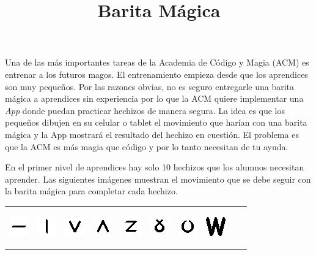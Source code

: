 \documentclass{oci}
\title{Barita Mágica}
\begin{document}
\begin{problemDescription}
Una de las más importantes tareas de la 
Academia de Código y Magia (ACM) es entrenar a los futuros magos.
El entrenamiento empieza desde que los aprendices son muy pequeños. 
Por las razones obvias, no es seguro entregarle una barita mágica a aprendices sin experiencia
por lo que la ACM quiere implementar una \emph{App} donde puedan practicar hechizos
de manera segura. La idea es que los pequeños dibujen en su celular o tablet 
el movimiento que harían con una barita mágica y la App mostrará el resultado del hechizo en cuestión.
El problema es que la ACM es más magia que código y por lo tanto necesitan de tu ayuda.

En el primer nivel de aprendices hay solo 10 hechizos que los alumnos necesitan aprender. 
Las siguientes imágenes muestran el movimiento que se debe seguir con la barita mágica para completar
cada hechizo.

\begin{center}
\begin{tabular}{cccccccccc}
\includegraphics{imgs/figA00.png} &
\includegraphics{imgs/figA01.png} &
\includegraphics{imgs/figA02.png} &
\includegraphics{imgs/figA03.png} &
\includegraphics{imgs/figA04.png} &
\includegraphics{imgs/figA05.png} &
\includegraphics{imgs/figA06.png} &
\begin{minipage}[b]{32pt}
\begin{center}
\includegraphics[scale=0.60]{imgs/figA07.png}\medskip


\end{center}
\end{minipage}
\end{tabular}
\end{center}
\end{problemDescription}
\end{document}
